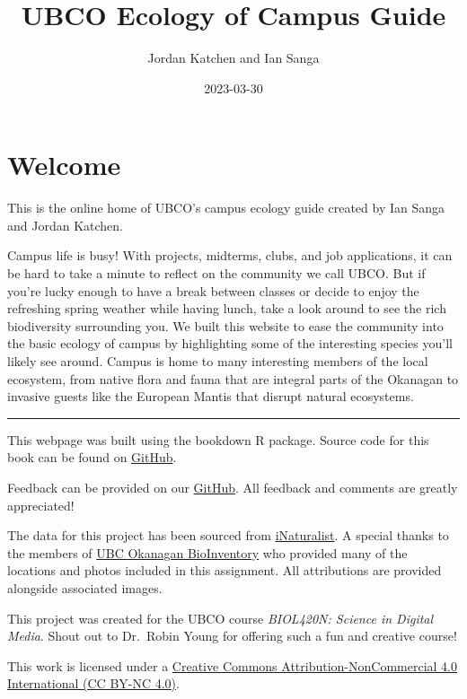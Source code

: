 \documentclass[
]{book}
\title{UBCO Ecology of Campus Guide}
\author{Jordan Katchen and Ian Sanga}
\date{2023-03-30}
\begin{document}
\maketitle

{
\setcounter{tocdepth}{1}
\tableofcontents
}
\hypertarget{welcome}{%
\chapter{Welcome}\label{welcome}}

This is the online home of UBCO's campus ecology guide created by Ian Sanga and Jordan Katchen.

Campus life is busy! With projects, midterms, clubs, and job applications, it can be hard to take a minute to reflect on the community we call UBCO. But if you're lucky enough to have a break between classes or decide to enjoy the refreshing spring weather while having lunch, take a look around to see the rich biodiversity surrounding you. We built this website to ease the community into the basic ecology of campus by highlighting some of the interesting species you'll likely see around. Campus is home to many interesting members of the local ecosystem, from native flora and fauna that are integral parts of the Okanagan to invasive guests like the European Mantis that disrupt natural ecosystems.

\begin{center}\rule{0.5\linewidth}{0.5pt}\end{center}

This webpage was built using the bookdown R package. Source code for this book can be found on \href{https://github.com/JordanK200/UBCO_ecology_guide}{GitHub}.

Feedback can be provided on our \href{https://github.com/JordanK200/UBCO_ecology_guide/issues}{GitHub}. All feedback and comments are greatly appreciated!

The data for this project has been sourced from \href{https://www.inaturalist.org/}{iNaturalist}. A special thanks to the members of \href{https://www.inaturalist.org/projects/ubc-okanagan-bioinventory}{UBC Okanagan BioInventory} who provided many of the locations and photos included in this assignment. All attributions are provided alongside associated images.

This project was created for the UBCO course \emph{BIOL420N: Science in Digital Media}. Shout out to Dr.~Robin Young for offering such a fun and creative course!

This work is licensed under a \href{https://creativecommons.org/licenses/by-nc/4.0/}{Creative Commons Attribution-NonCommercial 4.0 International (CC BY-NC 4.0)}.
\end{document}
